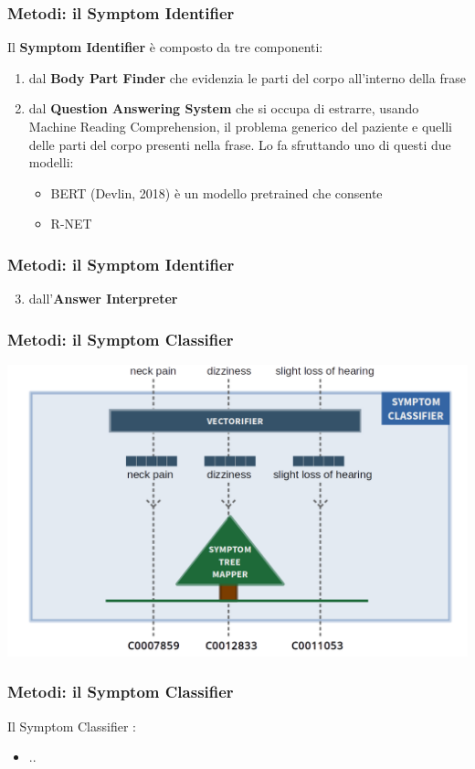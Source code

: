 \documentclass{beamer}
\begin{document}
\begin{frame}
\frametitle{Metodi: il Symptom Identifier}
Il \textbf{Symptom Identifier} è composto da tre componenti:\pause
\begin{enumerate}
 \item dal \textbf{Body Part Finder} che evidenzia le parti del corpo all'interno della frase\pause
 \item dal \textbf{Question Answering System } che si occupa di estrarre, usando Machine Reading Comprehension, il problema generico del paziente e quelli delle parti del corpo presenti nella frase. Lo fa sfruttando uno di questi due modelli:\pause
  \begin{itemize}
    \item BERT (Devlin, 2018) è un modello pretrained che consente \pause
    \item R-NET
  \end{itemize}
\end{enumerate}
\end{frame}

\begin{frame}
\frametitle{Metodi: il Symptom Identifier}
\begin{enumerate}
 \setcounter{enumi}{2}
  \item dall'\textbf{Answer Interpreter}
\end{enumerate}
\end{frame}

\begin{frame}
\frametitle{Metodi: il Symptom Classifier}
\includegraphics[width=\textwidth]{images/methods_overview2.png}
\end{frame}

\begin{frame}
\frametitle{Metodi: il Symptom Classifier}
Il Symptom Classifier :
\begin{itemize}
 \item ..
\end{itemize}
\end{frame}
\end{document}
